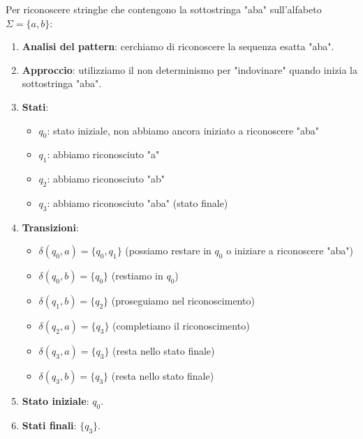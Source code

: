 \documentclass[12pt,a4paper]{article}
\begin{document}
\begin{risoluzione}
Per riconoscere stringhe che contengono la sottostringa "aba" sull'alfabeto $\Sigma = \{a, b\}$:

\begin{enumerate}
  \item \textbf{Analisi del pattern}: cerchiamo di riconoscere la sequenza esatta "aba".
  \item \textbf{Approccio}: utilizziamo il non determinismo per "indovinare" quando inizia la sottostringa "aba".
  \item \textbf{Stati}:
    \begin{itemize}
      \item $q_0$: stato iniziale, non abbiamo ancora iniziato a riconoscere "aba"
      \item $q_1$: abbiamo riconosciuto "a"
      \item $q_2$: abbiamo riconosciuto "ab"
      \item $q_3$: abbiamo riconosciuto "aba" (stato finale)
    \end{itemize}
  \item \textbf{Transizioni}:
    \begin{itemize}
      \item $\delta(q_0, a) = \{q_0, q_1\}$ (possiamo restare in $q_0$ o iniziare a riconoscere "aba")
      \item $\delta(q_0, b) = \{q_0\}$ (restiamo in $q_0$)
      \item $\delta(q_1, b) = \{q_2\}$ (proseguiamo nel riconoscimento)
      \item $\delta(q_2, a) = \{q_3\}$ (completiamo il riconoscimento)
      \item $\delta(q_3, a) = \{q_3\}$ (resta nello stato finale)
      \item $\delta(q_3, b) = \{q_3\}$ (resta nello stato finale)
    \end{itemize}
  \item \textbf{Stato iniziale}: $q_0$.
  \item \textbf{Stati finali}: $\{q_3\}$.
\end{enumerate}

\begin{figure}[h]
\centering
{}
\end{figure}
\end{risoluzione}
\end{document}
